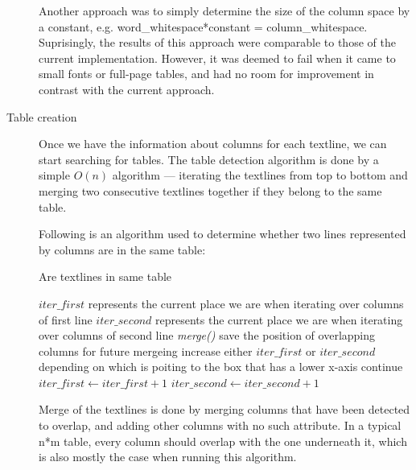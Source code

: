\begin{description}
Another approach was to simply determine the size of the column space by a constant, e.g. word\_whitespace*constant = column\_whitespace. Suprisingly, the results of this approach were comparable to those of the current implementation. However, it was deemed to fail when it came to small fonts or full-page tables, and had no room for improvement in contrast with the current approach.

\item[Table creation]

Once we have the information about columns for each textline, we can start searching for tables. The table detection algorithm is done by a simple $O(n)$ algorithm --- iterating the textlines from top to bottom and merging two consecutive textlines together if they belong to the same table.

Following is an algorithm used to determine whether two lines represented by columns are in the same table:


\begin{algorithm}[H]
\caption{Are textlines in same table}
\begin{algorithmic}[1]
\State $iter\_first$ represents the current place we are when iterating over columns of first line
\State $iter\_second$ represents the current place we are when iterating over columns of second line
\State \emph{merge()}
\EndIf
\EndIf
{} 
\State save the position of overlapping columns for future mergeing
\EndIf
\Else 
\State increase either $iter\_first$ or $iter\_second$ depending on which is poiting to the box that has a lower x-axis
\State continue
\EndIf
\State $iter\_first \gets iter\_first+1$
\State $iter\_second \gets iter\_second+1$
\EndWhile
\end{algorithmic}
\end{algorithm}

Merge of the textlines is done by merging columns that have been detected to overlap, and adding other columns with no such attribute. In a typical n*m table, every column should overlap with the one underneath it, which is also mostly the case when running this algorithm.


\end{description}

